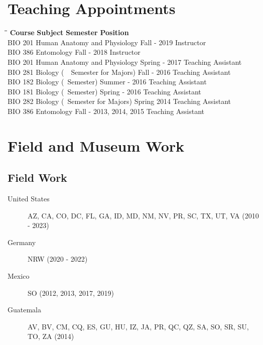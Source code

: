 \documentclass[12pt,a4paper]{article}
\begin{document}
\section*{Teaching Appointments}
	\begin{tabbing}
		\hspace{2cm}\=\hspace{6.5cm}\=\hspace{4cm}\=\kill
		\textbf{Course} \> \textbf{Subject} \> \textbf{Semester} \> \textbf{Position}\\
		BIO 201 \> Human Anatomy and Physiology \> Fall - 2019 \> Instructor \\
		BIO 386 \> Entomology \> Fall - 2018 \> Instructor \\ 
		BIO 201 \> Human Anatomy and Physiology \> Spring - 2017 \> Teaching Assistant \\
		BIO 281 \> Biology (~~Semester for Majors) \> Fall - 2016 \> Teaching Assistant \\
		BIO 182 \> Biology (~Semester) \> Summer - 2016 \> Teaching Assistant \\
		BIO 181 \> Biology (~Semester) \> Spring - 2016 \> Teaching Assistant \\
		BIO 282 \> Biology (~Semester for Majors) \> Spring 2014 \> Teaching Assistant \\
		BIO 386 \> Entomology \> Fall - 2013, 2014, 2015 \> Teaching Assistant
	\end{tabbing} 

\section*{Field and Museum Work}
	\subsection*{Field Work}
		\begin{description}
			\item [United States] \tabto*{3cm} AZ, CA, CO, DC, FL, GA, ID, MD, NM, NV, PR, SC, TX, UT, VA (2010 - 2023)
			\item [Germany] \tabto*{3cm} NRW (2020 - 2022)
			\item [Mexico] \tabto*{3cm} SO (2012, 2013, 2017, 2019)
			\item [Guatemala] \tabto*{3cm} AV, BV, CM, CQ, ES, GU, HU, IZ, JA, PR, QC, QZ, SA, SO, SR, SU, TO, ZA (2014)
		\end{description}
\end{document}
